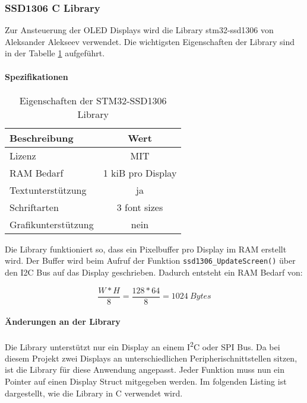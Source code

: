 \subsubsection{SSD1306 C Library}
\label{sec:Library_ssd1306}

Zur Ansteuerung der OLED Displays wird die Library stm32-ssd1306 von Aleksander Alekseev \cite{stm32-ssd1306} verwendet. Die wichtigsten Eigenschaften der Library sind in der Tabelle \ref{tab:LibSSD1306} aufgeführt.

\paragraph{Spezifikationen}

\begin{table}[H]
	\centering
	\begin{tabular}{|l|c|}
		\hline
		\textbf{Beschreibung} & \textbf{Wert}     \\ \hline
		Lizenz                & MIT               \\ \hline
		RAM Bedarf            & 1 kiB pro Display \\ \hline
		Textunterstützung     & ja                \\ \hline
		Schriftarten          & 3 font sizes      \\ \hline
		Grafikunterstützung   & nein              \\ \hline
	\end{tabular}
	\caption{Eigenschaften der STM32-SSD1306 Library}
	\label{tab:LibSSD1306}
\end{table}

Die Library funktioniert so, dass ein Pixelbuffer pro Display im RAM erstellt wird.
Der Buffer wird beim Aufruf der Funktion \texttt{ssd1306\_UpdateScreen()} über den I2C Bus auf das Display geschrieben.
Dadurch entsteht ein RAM Bedarf von:

\begin{equation}
\frac{W * H}{8} = \frac{128 * 64}{8} = 1024\ \si{Bytes}
\end{equation}

\paragraph{Änderungen an der Library}

Die Library unterstützt nur ein Display an einem I\textsuperscript{2}C oder SPI Bus. Da bei diesem Projekt zwei Displays an unterschiedlichen Peripherischnittstellen sitzen, ist die Library für diese Anwendung angepasst.
Jeder Funktion muss nun ein Pointer auf einen Display Struct mitgegeben werden.
Im folgenden Listing ist dargestellt, wie die Library in C verwendet wird.

